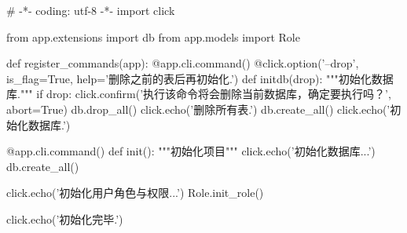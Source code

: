 \begin{codeblock}[language=Python]
# -*- coding: utf-8 -*-
import click

from app.extensions import db
from app.models import Role


def register_commands(app):
    @app.cli.command()
    @click.option('--drop', is_flag=True, help='删除之前的表后再初始化.')
    def initdb(drop):
        """初始化数据库."""
        if drop:
            click.confirm('执行该命令将会删除当前数据库，确定要执行吗？', abort=True)
            db.drop_all()
            click.echo('删除所有表.')
        db.create_all()
        click.echo('初始化数据库.')

    @app.cli.command()
    def init():
        """初始化项目"""
        click.echo('初始化数据库...')
        db.create_all()
        
        click.echo('初始化用户角色与权限...')
        Role.init_role()

        click.echo('初始化完毕.')
\end{codeblock}

